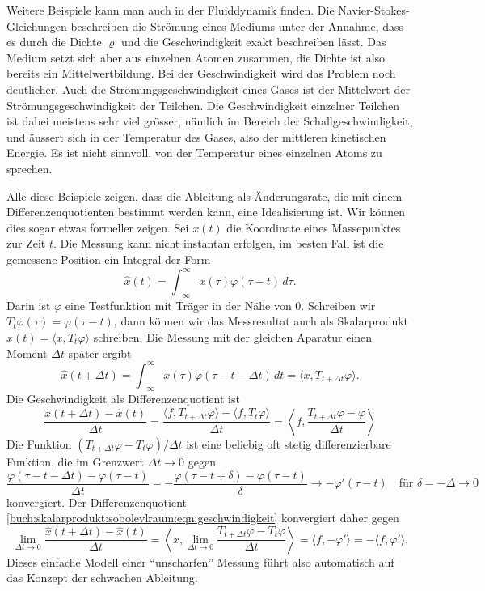 Weitere Beispiele kann man auch in der Fluiddynamik finden.
Die Navier-Stokes-Gleichungen beschreiben die Strömung eines Mediums
unter der Annahme, dass es durch die Dichte $\varrho$ und die
Geschwindigkeit exakt beschreiben lässt.
Das Medium setzt sich aber aus einzelnen Atomen zusammen, die Dichte
ist also bereits ein Mittelwertbildung.
Bei der Geschwindigkeit wird das Problem noch deutlicher.
Auch die Strömungsgeschwindigkeit eines Gases ist der Mittelwert der
Strömungsgeschwindigkeit der Teilchen. 
Die Geschwindigkeit einzelner Teilchen ist dabei meistens sehr viel
grösser, nämlich im Bereich der Schallgeschwindigkeit, und äussert sich
in der Temperatur des Gases, also der mittleren kinetischen Energie.
Es ist nicht sinnvoll, von der Temperatur eines einzelnen Atoms zu
sprechen.

Alle diese Beispiele zeigen, dass die Ableitung als Änderungsrate, die
mit einem Differenzenquotienten bestimmt werden kann, eine Idealisierung
ist.
Wir können dies sogar etwas formeller zeigen.
Sei $x(t)$ die Koordinate eines Massepunktes zur Zeit $t$.
Die Messung kann nicht instantan erfolgen, im besten Fall ist die
gemessene Position ein Integral der Form
\[
\hat{x}(t)
=
\int_{-\infty}^\infty x(\tau) \varphi(\tau - t)\,d\tau.
\]
Darin ist $\varphi$ eine Testfunktion mit Träger in der Nähe von $0$.
Schreiben wir $T_t\varphi(\tau) = \varphi(\tau -t)$, dann können wir
das Messresultat auch als Skalarprodukt
$\hat{x}(t)=\langle x,T_t\varphi\rangle$
schreiben.
Die Messung mit der gleichen Aparatur einen Moment $\Delta t$ später ergibt
\[
\hat{x}(t+\Delta t)
=
\int_{-\infty}^\infty x(\tau) \varphi(\tau-t-\Delta t)\,dt
=
\langle x, T_{t+\Delta t}\varphi\rangle.
\]
Die Geschwindigkeit als Differenzenquotient ist
\begin{equation}
\frac{
\hat{x}(t+\Delta t)-\hat{x}(t)
}{\Delta t}
=
\frac{
\langle f,T_{t+\Delta t}\varphi\rangle
-
\langle f,T_{t}\varphi\rangle
}{
\Delta t
}
=
\left\langle
f,\frac{T_{t+\Delta t}\varphi - \varphi}{\Delta t}
\right\rangle
\label{buch:skalarprodukt:sobolevlraum:eqn:geschwindigkeit}
\end{equation}
Die Funktion $(T_{t+\Delta t}\varphi-T_t\varphi)/\Delta t$ ist eine 
beliebig oft stetig differenzierbare Funktion, die im Grenzwert
$\Delta t\to 0$ gegen
\[
\frac{
\varphi(\tau - t - \Delta t)
-
\varphi(\tau - t)
}{
\Delta t
}
=
-
\frac{
\varphi(\tau - t + \delta) - \varphi(\tau - t)
}{
\delta
}
\to 
-
\varphi'(\tau - t)
\quad
\text{für $\delta = - \Delta \to 0$}
\]
konvergiert.
Der Differenzenquotient
\eqref{buch:skalarprodukt:sobolevlraum:eqn:geschwindigkeit}
konvergiert daher gegen
\[
\lim_{\Delta t\to 0}
\frac{
\hat{x}(t+\Delta t)-\hat{x}(t)
}{\Delta t}
=
\left\langle
x,
\lim_{\Delta t\to 0}
\frac{T_{t+\Delta t}\varphi-T_t\varphi}{\Delta t}
\right\rangle
=
\langle f,-\varphi'\rangle
=
-
\langle f, \varphi'\rangle.
\]
Dieses einfache Modell einer ``unscharfen'' Messung führt also automatisch
auf das Konzept der schwachen Ableitung.






